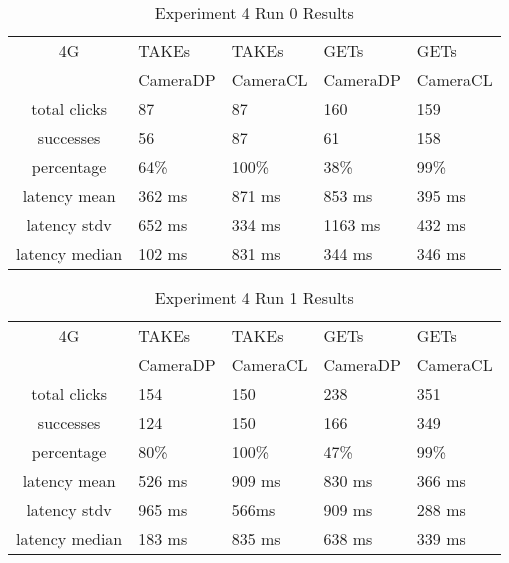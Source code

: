 \begin{table}[htb]
\begin{scriptsize} 
\caption{Experiment 4 Run 0 Results} 
\label{table:exp-4-run0-results}
 \begin{center}
 \begin{tabular}{| c | p{1.5cm} | p{1.5cm} | p{1.5cm} | p{1.4cm} |}
  \hline
  4G & TAKEs & TAKEs & GETs & GETs \\
  & CameraDP & CameraCL & CameraDP & CameraCL \\
  \hline
  total clicks & 87 & 87 & 160 & 159 \\
  \hline
  successes & 56 & 87 & 61 & 158 \\
  \hline
  percentage & 64\% & 100\% & 38\% & 99\% \\
  \hline
  latency mean & 362 ms & 871 ms & 853 ms & 395 ms \\
  \hline
  latency stdv & 652 ms &334 ms &1163 ms & 432 ms \\
  \hline
  latency median & 102 ms & 831 ms & 344 ms & 346 ms \\
  \hline
  \end{tabular}

  \end{center}
\end{scriptsize}
\end{table}

\begin{table}[htb]
\begin{scriptsize} 
\caption{Experiment 4 Run 1 Results} 
\label{table:exp-4-run1-results}
 \begin{center}
 \begin{tabular}{| c | p{1.5cm} | p{1.5cm} | p{1.5cm} | p{1.4cm} |}
  \hline
  4G & TAKEs & TAKEs & GETs & GETs \\
  & CameraDP & CameraCL & CameraDP & CameraCL \\
  \hline
  total clicks & 154 & 150 & 238 & 351 \\
  \hline
  successes & 124 & 150 & 166 & 349 \\
  \hline
  percentage & 80\% & 100\% & 47\% & 99\% \\
  \hline
  latency mean & 526 ms & 909 ms & 830 ms & 366 ms \\
  \hline
  latency stdv & 965 ms & 566ms & 909 ms & 288 ms \\
  \hline
  latency median & 183 ms & 835 ms & 638 ms & 339 ms \\
  \hline
  \end{tabular}
  \end{center}
\end{scriptsize}
\end{table}

